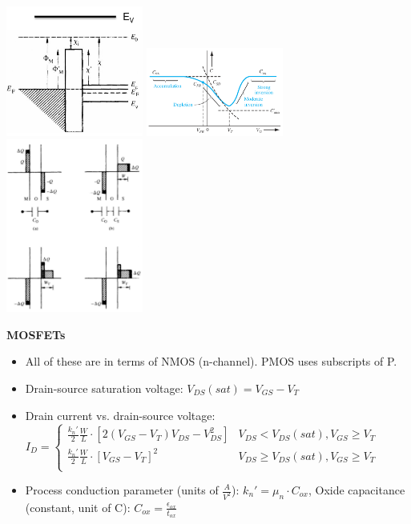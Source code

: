 \documentclass{article}
\begin{document}
\begin{center}
    \includegraphics[align=c, width=4.5cm]{mosflat.png}
    \includegraphics[align=c, width=4.5cm]{moscv.png}
    \includegraphics[align=c, width=4.5cm]{moscap.png}
\end{center}
\textbf{MOSFETs}
\begin{itemize}
    \item All of these are in terms of NMOS (n-channel). PMOS uses subscripts of P.
    \item Drain-source saturation voltage: $V_{DS}(sat) = V_{GS} - V_T$
    \item Drain current vs. drain-source voltage: $I_D = \begin{cases}
        \frac{k_n'}{2} \frac{W}{L} \cdot \left[2(V_{GS} - V_T) V_{DS} - V_{DS}^2\right] & V_{DS} < V_{DS}(sat), V_{GS} \geq V_T \\
        \frac{k_n'}{2} \frac{W}{L} \cdot \left[V_{GS} - V_T\right]^2 & V_{DS} \geq V_{DS}(sat), V_{GS} \geq V_T \\
    \end{cases}$
    \item Process conduction parameter (units of $\frac{A}{V^2}$): $k_n' = \mu_n \cdot C_{ox}$, Oxide capacitance (constant, unit of C): $C_{ox} = \frac{\epsilon_{ox}}{t_{ox}}$
\end{itemize}
\end{document}
